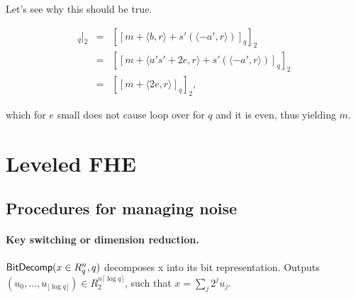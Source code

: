 \documentclass[11pt]{article}
\begin{document}






Let's see why this should be true.

\begin{eqnarray*}
[[\langle c, s \rangle]_q]_2 &=& [[m + \langle b, r \rangle + s'(\langle -a', r \rangle) ]_q]_2 \\
&=& [[m + \langle a's'+2e, r \rangle + s'(\langle -a', r \rangle) ]_q]_2  \\
&=& [[m + \langle 2e, r \rangle ]_q]_2,
\end{eqnarray*}

which for $e$ small does not cause loop over for $q$ and it is even, thus yielding $m$.


\section{Leveled FHE}


\subsection{Procedures for managing noise}

\paragraph{Key switching or dimension reduction.}
$\mathsf{BitDecomp}(x \in R^n_q, q)$ decomposes x into its bit representation. Outputs $(u_0, \dots, u_{\lfloor \log q \rfloor}) \in R_2^{n\lceil \log q \rceil }$, such that $x = \sum_j 2^j u_j$.
\end{document}
